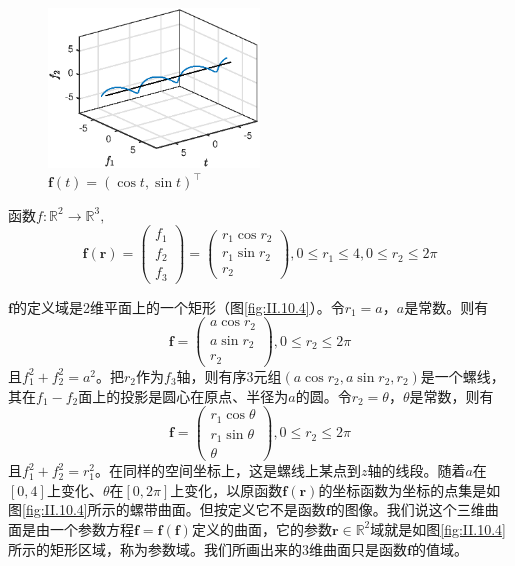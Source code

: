 \documentclass[main.tex]{subfiles}
\begin{document}
\begin{figure}[h]
    \centering
    \includegraphics[width=0.5\textwidth]{images/II.10.3.eps}
    \caption{$\mathbf{f}\left(t\right)=\left(\cos t,\sin t\right)^\intercal$}
    \label{fig:II.10.3}
\end{figure}
\begin{example}
函数$f:\mathbb{R}^2\rightarrow\mathbb{R}^3,$
\[
\mathbf{f}\left(\mathbf{r}\right)=\left(\begin{array}{c}f_1\\f_2\\f_3\end{array}\right)=\left(\begin{array}{c}r_1\cos r_2\\r_1\sin r_2\\r_2\end{array}\right),0\leq r_1\leq 4,0\leq r_2\leq 2\pi
\]

$\mathbf{f}$的定义域是2维平面上的一个矩形（图\ref{fig:II.10.4}）。令$r_1=a$，$a$是常数。则有
\[
\mathbf{f}=\left(\begin{array}{c}
    a\cos r_2\\
    a\sin r_2\\
    r_2
    \end{array}\right),0\leq r_2\leq 2\pi
\]
且$f_1^2+f_2^2=a^2$。把$r_2$作为$f_3$轴，则有序3元组$\left(a\cos r_2,a\sin r_2,r_2\right)$是一个螺线，其在$f_1-f_2$面上的投影是圆心在原点、半径为$a$的圆。令$r_2=\theta$，$\theta$是常数，则有
\[
\mathbf{f}=\left(\begin{array}{c}
    r_1\cos \theta\\
    r_1\sin \theta\\
    \theta
    \end{array}\right),0\leq r_2\leq 2\pi
\]
且$f_1^2+f_2^2=r_1^2$。在同样的空间坐标上，这是螺线上某点到$z$轴的线段。随着$a$在$\left[0,4\right]$上变化、$\theta$在$\left[0,2\pi\right]$上变化，以原函数$\mathbf{f}\left(\mathbf{r}\right)$的坐标函数为坐标的点集是如图\ref{fig:II.10.4}所示的螺带曲面。但按定义它不是函数$\mathbf{f}$的图像。我们说这个三维曲面是由一个参数方程$\mathbf{f}=\mathbf{f}\left(\mathbf{f}\right)$定义的曲面，它的参数$\mathbf{r}\in\mathbb{R}^2$域就是如图\ref{fig:II.10.4}所示的矩形区域，称为参数域。我们所画出来的3维曲面只是函数$\mathbf{f}$的值域。
\end{example}
\end{document}
